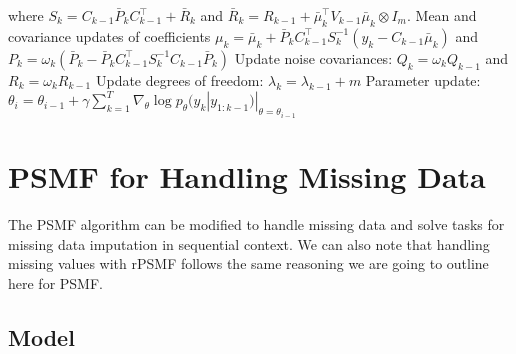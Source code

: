 \documentclass{mldsmsc}
\begin{document}
\begin{algorithm}[h]
\begin{algorithmic}[1]
\State \hspace{2em} where $S_k = C_{k-1} \bar{P}_k C_{k-1}^\top + \bar{R}_k$ and \hspace{1em} $\bar{R}_k = R_{k-1} + \bar{\mu}_k^\top V_{k-1} \bar{\mu}_k \otimes I_m$.
\State \hspace{2em} Mean and covariance updates of coefficients
\State \hspace{3em} $\mu_k = \bar{\mu}_k + \bar{P}_k C_{k-1}^\top S_k^{-1} (y_k - C_{k-1} \bar{\mu}_k)$ and \hspace{1em} $P_k = \omega_k (\bar{P}_k - \bar{P}_k C_{k-1}^\top S_k^{-1} C_{k-1} \bar{P}_k)$
\State \hspace{2em} Update noise covariances:
\State \hspace{3em} $Q_k = \omega_k Q_{k-1}$ and $R_k = \omega_k R_{k-1}$
\State \hspace{2em} Update degrees of freedom: 
\State \hspace{3em} $\lambda_k = \lambda_{k-1} + m$
\State \hspace{1em} Parameter update: 
\State \hspace{2em} $\theta_i = \theta_{i-1} + \gamma \sum_{k=1}^T \nabla_\theta \log p_\theta (y_k | y_{1:k-1}) |_{\theta = \theta_{i-1}}$
\end{algorithmic}\label{algo:2}
\end{algorithm}

\section{PSMF for Handling Missing Data}

The PSMF algorithm can be modified to handle missing data and solve tasks for missing data imputation in sequential context. We can also note that handling missing values with rPSMF follows the same reasoning we are going to outline here for PSMF.

\subsection{Model}
\end{document}

